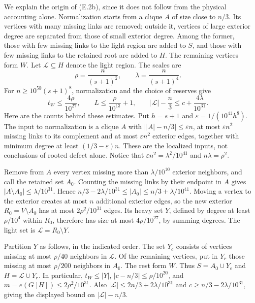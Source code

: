 \documentclass[english,11pt,a4paper]{article}
\begin{document}
We explain the origin of (E.2b), since it does not follow from the physical accounting alone. Normalization starts from a clique \(A\) of size close to \(n/3\). Its vertices with many missing links are removed; outside it, vertices of large exterior degree are separated from those of small exterior degree. Among the former, those with few missing links to the light region are added to \(S\), and those with few missing links to the retained root are added to \(H\). The remaining vertices form \(W\). Let \(\mathcal L\subseteq H\) denote the light region. The scales are \[
\rho=\frac{n}{(s+1)^2},\qquad \lambda=\frac{n}{(s+1)^4}.
\] For \(n\ge10^{50}(s+1)^8\), normalization and the choice of reserves give \[
t_W\le\frac{4\rho}{10^{27}},\qquad
L\le\frac{\rho}{10^{13}}+1,\qquad
|\mathcal L|-\frac n3\le c+\frac{4\lambda}{10^{31}}.
\] Here are the counts behind these estimates. Put \(h=s+1\) and \(\varepsilon=1/(10^{41}h^8)\). The input to normalization is a clique \(A\) with \(\bigl||A|-n/3\bigr|\le\varepsilon n\), at most \(\varepsilon n^2\) missing links to its complement and at most \(\varepsilon n^2\) exterior edges, together with minimum degree at least \((1/3-\varepsilon)n\). These are the localized inputs, not conclusions of rooted defect alone. Notice that \(\varepsilon n^2=\lambda^2/10^{41}\) and \(n\lambda=\rho^2\).

Remove from \(A\) every vertex missing more than \(\lambda/10^{10}\) exterior neighbors, and call the retained set \(A_0\). Counting the missing links by their endpoint in \(A\) gives \(|A\setminus A_0|\le\lambda/10^{31}\). Hence \(n/3-2\lambda/10^{31}\le|A_0|\le n/3+\lambda/10^{41}\). Moving a vertex to the exterior creates at most \(n\) additional exterior edges, so the new exterior \(R_0=V\setminus A_0\) has at most \(2\rho^2/10^{31}\) edges. Its heavy set \(Y\), defined by degree at least \(\rho/10^4\) within \(R_0\), therefore has size at most \(4\rho/10^{27}\), by summing degrees. The light set is \(\mathcal L=R_0\setminus Y\).

Partition \(Y\) as follows, in the indicated order. The set \(Y_c\) consists of vertices missing at most \(\rho/40\) neighbors in \(\mathcal L\). Of the remaining vertices, put in \(Y_r\) those missing at most \(\rho/200\) neighbors in \(A_0\). The rest form \(W\). Thus \(S=A_0\cup Y_c\) and \(H=\mathcal L\cup Y_r\). In particular, \(t_W\le|Y|\), \(|c-n/3|\le\rho/10^{20}\), and \(m=e(G[H])\le2\rho^2/10^{31}\). Also \(|\mathcal L|\le2n/3+2\lambda/10^{31}\) and \(c\ge n/3-2\lambda/10^{31}\), giving the displayed bound on \(|\mathcal L|-n/3\).
\end{document}
